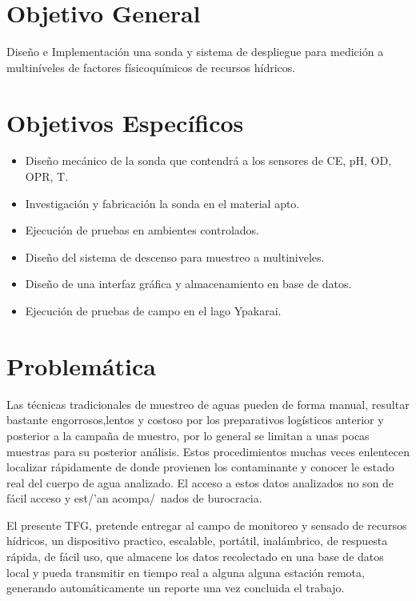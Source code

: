 \section{Objetivo General}
Dise\~no e Implementaci\'on una sonda y sistema de despliegue para medici\'on a multin\'iveles de factores f\'isicoqu\'imicos de recursos h\'idricos.


\section{Objetivos Específicos}
\begin{itemize}
	\item Dise\~no mec\'anico de la sonda que contendr\'a a los sensores de CE, pH, OD, OPR, T.
    \item Investigaci\'on y fabricaci\'on  la sonda en el material apto.
    \item Ejecuci\'on de pruebas en ambientes controlados.
    \item Dise\~no del sistema de descenso para muestreo a multiniveles.
    \item Dise\~no de una interfaz gr\'afica y almacenamiento en base de datos.  
    \item Ejecuci\'on de pruebas de campo en el lago Ypakarai.

\end{itemize}

\section{Problem\'atica} 

Las t\'ecnicas tradicionales de muestreo  de aguas  pueden de forma manual, resultar bastante engorrosos,lentos y costoso por los preparativos log\'isticos anterior y posterior a la campa\~na de muestro, por lo general se limitan a unas pocas muestras para su posterior análisis. Estos  procedimientos muchas veces enlentecen localizar r\'apidamente de donde provienen los contaminante y conocer le estado real del cuerpo de agua analizado. El acceso a estos datos analizados no son de fácil acceso y est/'an acompa/~nados de burocracia.  


 
El presente TFG, pretende entregar al campo de monitoreo y sensado de recursos h\'idricos, un dispositivo practico, escalable, port\'atil, inal\'ambrico, de respuesta r\'apida, de f\'acil uso, que almacene los datos recolectado en una base de datos local y pueda transmitir en tiempo real a alguna alguna estación remota, generando automáticamente un reporte una vez concluida el trabajo. 

